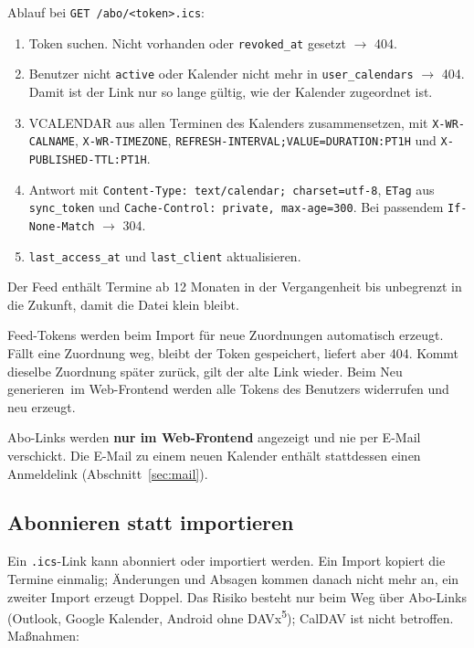 \documentclass[a4paper,fontsize=10pt]{scrartcl}
\newcommand{\code}[1]{\texttt{#1}}
\begin{document}
Ablauf bei \code{GET /abo/<token>.ics}:

\begin{enumerate}
  \item Token suchen. Nicht vorhanden oder \code{revoked\_at} gesetzt
        $\rightarrow$ 404.
  \item Benutzer nicht \code{active} oder Kalender nicht mehr in
        \code{user\_calendars} $\rightarrow$ 404. Damit ist der Link nur so
        lange gültig, wie der Kalender zugeordnet ist.
  \item VCALENDAR aus allen Terminen des Kalenders zusammensetzen, mit
        \code{X-WR-CALNAME}, \code{X-WR-TIMEZONE},
        \code{REFRESH-INTERVAL;VALUE=DURATION:PT1H} und
        \code{X-PUBLISHED-TTL:PT1H}.
  \item Antwort mit \code{Content-Type: text/calendar; charset=utf-8},
        \code{ETag} aus \code{sync\_token} und \code{Cache-Control:
        private, max-age=300}. Bei passendem \code{If-None-Match}
        $\rightarrow$ 304.
  \item \code{last\_access\_at} und \code{last\_client} aktualisieren.
\end{enumerate}

Der Feed enthält Termine ab 12 Monaten in der Vergangenheit bis
unbegrenzt in die Zukunft, damit die Datei klein bleibt.

Feed-Tokens werden beim Import für neue Zuordnungen automatisch erzeugt.
Fällt eine Zuordnung weg, bleibt der Token gespeichert, liefert aber 404.
Kommt dieselbe Zuordnung später zurück, gilt der alte Link wieder.
Beim \glqq Neu generieren\grqq\ im Web-Frontend werden alle Tokens des
Benutzers widerrufen und neu erzeugt.

Abo-Links werden \textbf{nur im Web-Frontend} angezeigt und nie per E-Mail
verschickt. Die E-Mail zu einem neuen Kalender enthält stattdessen einen
Anmeldelink (Abschnitt~\ref{sec:mail}).

\subsection*{Abonnieren statt importieren}

Ein \texttt{.ics}-Link kann abonniert oder importiert werden. Ein Import
kopiert die Termine einmalig; Änderungen und Absagen kommen danach nicht mehr
an, ein zweiter Import erzeugt Doppel. Das Risiko besteht nur beim Weg über
Abo-Links (Outlook, Google Kalender, Android ohne DAVx\textsuperscript{5});
CalDAV ist nicht betroffen. Maßnahmen:
\end{document}
